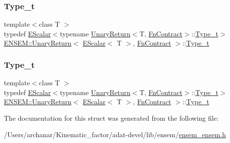 \subsubsection{\texorpdfstring{Type\_t}{Type\_t}\hspace{0.1cm}{\footnotesize\ttfamily [2/3]}}
{\footnotesize\ttfamily template$<$class T $>$ \\
typedef \mbox{\hyperlink{classENSEM_1_1EScalar}{E\+Scalar}}$<$typename \mbox{\hyperlink{structENSEM_1_1UnaryReturn}{Unary\+Return}}$<$T, \mbox{\hyperlink{structENSEM_1_1FnContract}{Fn\+Contract}}$>$\+::\mbox{\hyperlink{structENSEM_1_1UnaryReturn_3_01EScalar_3_01T_01_4_00_01FnContract_01_4_a0838f4fd4b6341784128502cc2256180}{Type\+\_\+t}}$>$ \mbox{\hyperlink{structENSEM_1_1UnaryReturn}{E\+N\+S\+E\+M\+::\+Unary\+Return}}$<$ \mbox{\hyperlink{classENSEM_1_1EScalar}{E\+Scalar}}$<$ T $>$, \mbox{\hyperlink{structENSEM_1_1FnContract}{Fn\+Contract}} $>$\+::\mbox{\hyperlink{structENSEM_1_1UnaryReturn_3_01EScalar_3_01T_01_4_00_01FnContract_01_4_a0838f4fd4b6341784128502cc2256180}{Type\+\_\+t}}}

\mbox{\label{structENSEM_1_1UnaryReturn_3_01EScalar_3_01T_01_4_00_01FnContract_01_4_a0838f4fd4b6341784128502cc2256180}} 
\subsubsection{\texorpdfstring{Type\_t}{Type\_t}\hspace{0.1cm}{\footnotesize\ttfamily [3/3]}}
{\footnotesize\ttfamily template$<$class T $>$ \\
typedef \mbox{\hyperlink{classENSEM_1_1EScalar}{E\+Scalar}}$<$typename \mbox{\hyperlink{structENSEM_1_1UnaryReturn}{Unary\+Return}}$<$T, \mbox{\hyperlink{structENSEM_1_1FnContract}{Fn\+Contract}}$>$\+::\mbox{\hyperlink{structENSEM_1_1UnaryReturn_3_01EScalar_3_01T_01_4_00_01FnContract_01_4_a0838f4fd4b6341784128502cc2256180}{Type\+\_\+t}}$>$ \mbox{\hyperlink{structENSEM_1_1UnaryReturn}{E\+N\+S\+E\+M\+::\+Unary\+Return}}$<$ \mbox{\hyperlink{classENSEM_1_1EScalar}{E\+Scalar}}$<$ T $>$, \mbox{\hyperlink{structENSEM_1_1FnContract}{Fn\+Contract}} $>$\+::\mbox{\hyperlink{structENSEM_1_1UnaryReturn_3_01EScalar_3_01T_01_4_00_01FnContract_01_4_a0838f4fd4b6341784128502cc2256180}{Type\+\_\+t}}}



The documentation for this struct was generated from the following file\+:\begin{DoxyCompactItemize}
\item 
/\+Users/archanar/\+Kinematic\+\_\+factor/adat-\/devel/lib/ensem/\mbox{\hyperlink{adat-devel_2lib_2ensem_2ensem__ensem_8h}{ensem\+\_\+ensem.\+h}}\end{DoxyCompactItemize}
